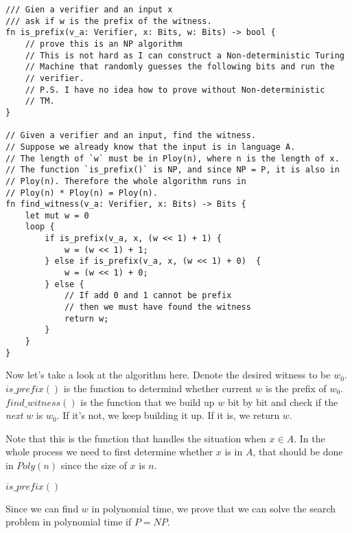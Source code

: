 \begin{lstlisting}
/// Gien a verifier and an input x
/// ask if w is the prefix of the witness.
fn is_prefix(v_a: Verifier, x: Bits, w: Bits) -> bool {
	// prove this is an NP algorithm
	// This is not hard as I can construct a Non-deterministic Turing
	// Machine that randomly guesses the following bits and run the 
	// verifier.
	// P.S. I have no idea how to prove without Non-deterministic 
	// TM.
}

// Given a verifier and an input, find the witness.
// Suppose we already know that the input is in language A.
// The length of `w` must be in Ploy(n), where n is the length of x.
// The function `is_prefix()` is NP, and since NP = P, it is also in
// Ploy(n). Therefore the whole algorithm runs in 
// Ploy(n) * Ploy(n) = Ploy(n).
fn find_witness(v_a: Verifier, x: Bits) -> Bits {
	let mut w = 0
	loop {
		if is_prefix(v_a, x, (w << 1) + 1) {
			w = (w << 1) + 1;
		} else if is_prefix(v_a, x, (w << 1) + 0)  {
			w = (w << 1) + 0;
		} else {
            // If add 0 and 1 cannot be prefix
            // then we must have found the witness
			return w;
		}
	}
}
\end{lstlisting}

Now let's take a look at the algorithm here. Denote the desired witness to be 
$w_0$. $is\_prefix()$ is the function to determind whether current $w$ is the 
prefix of $w_0$. $find\_witness()$ is the function that we build up $w$ bit by 
bit and check if the \emph{next} $w$ is $w_0$. If it's not, we keep building it 
up. If it is, we return $w$.

Note that this is the function that handles the situation when $x \in A$. In the 
whole process we need to first determine whether $x$ is in $A$, that should be 
done in $Poly(n)$ since the size of $x$ is $n$. 

$is\_prefix()$


Since we can find $w$ in polynomial time, we prove that we can solve the 
search problem in polynomial time if $P = NP$.

